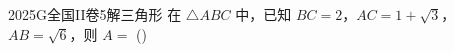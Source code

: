 
\begin{problem}{2025}{G}{全国II卷}{5}{解三角形}
在 $\triangle ABC$ 中，已知 $BC=2$，$AC=1+\sqrt{3}$，$AB=\sqrt{6}$，则 $A=$
(\hspace{1cm})
\begin{choices}
\end{choices}
\end{problem}